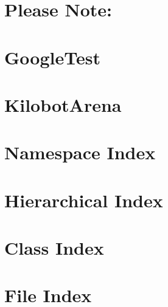 \documentclass[twoside]{book}
\newcommand{\+}{\discretionary{\mbox{\scriptsize$\hookleftarrow$}}{}{}}
\begin{document}
\chapter{Please Note\+:}
\label{md___users_peterjanku__sources_cpp__kilobot_arena_external_googletest_googletest_scripts__r_e_a_d_m_e}

\chapter{Google\+Test}
\label{md___users_peterjanku__sources_cpp__kilobot_arena_external_googletest__r_e_a_d_m_e}

\chapter{Kilobot\+Arena}
\label{md___users_peterjanku__sources_cpp__kilobot_arena__r_e_a_d_m_e}

\chapter{Namespace Index}

\chapter{Hierarchical Index}

\chapter{Class Index}

\chapter{File Index}

\end{document}
